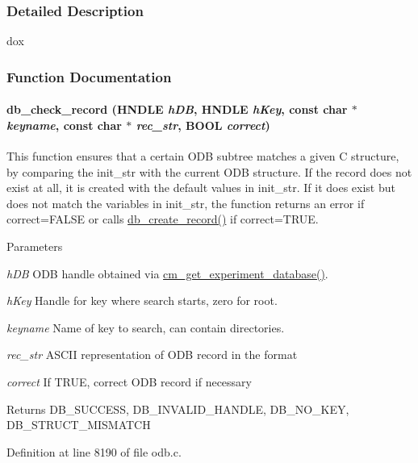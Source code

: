 \subsubsection{Detailed Description}
dox 

\subsubsection{Function Documentation}
\paragraph[{db\_\-check\_\-record}]{ db\_\-check\_\-record (HNDLE {\em hDB}, \/  HNDLE {\em hKey}, \/  const char $\ast$ {\em keyname}, \/  const char $\ast$ {\em rec\_\-str}, \/  {\bf BOOL} {\em correct})}\hfill\label{group__odbfunctionc_gad504df013bd9f61366ed48d6666985a1}
This function ensures that a certain ODB subtree matches a given C structure, by comparing the init\_\-str with the current ODB structure. If the record does not exist at all, it is created with the default values in init\_\-str. If it does exist but does not match the variables in init\_\-str, the function returns an error if correct=FALSE or calls \hyperlink{group__odbfunctionc_ga59b971e77416b2b463e2e63f1b05342b}{db\_\-create\_\-record()} if correct=TRUE. 
\begin{DoxyParams}{Parameters}
\item[{\em hDB}]ODB handle obtained via \hyperlink{group__cmfunctionc_ga16b33b70783a3f5ba98b4094149d12b7}{cm\_\-get\_\-experiment\_\-database()}. \item[{\em hKey}]Handle for key where search starts, zero for root. \item[{\em keyname}]Name of key to search, can contain directories. \item[{\em rec\_\-str}]ASCII representation of ODB record in the format \item[{\em correct}]If TRUE, correct ODB record if necessary \end{DoxyParams}
\begin{DoxyReturn}{Returns}
DB\_\-SUCCESS, DB\_\-INVALID\_\-HANDLE, DB\_\-NO\_\-KEY, DB\_\-STRUCT\_\-MISMATCH 
\end{DoxyReturn}


Definition at line 8190 of file odb.c.

